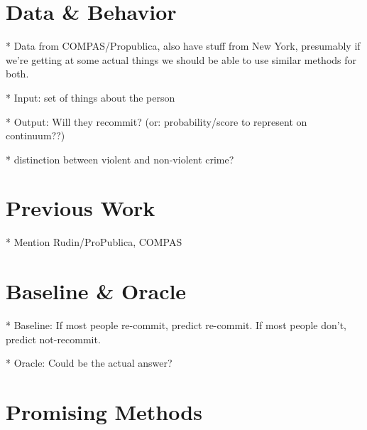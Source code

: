 \documentclass[10pt]{article}
\begin{document}
\section{Data \& Behavior}
* Data from COMPAS/Propublica, also have stuff from New York, presumably if we're getting at some actual things we should be able to use similar methods for both.

* Input: set of things about the person

* Output: Will they recommit? (or: probability/score to represent on continuum??)

* distinction between violent and non-violent crime?

\section{Previous Work}
* Mention Rudin/ProPublica, COMPAS

\section{Baseline \& Oracle}
* Baseline: If most people re-commit, predict re-commit. If most people don't, predict not-recommit.

* Oracle: Could be the actual answer?

\section{Promising Methods}
\end{document}
